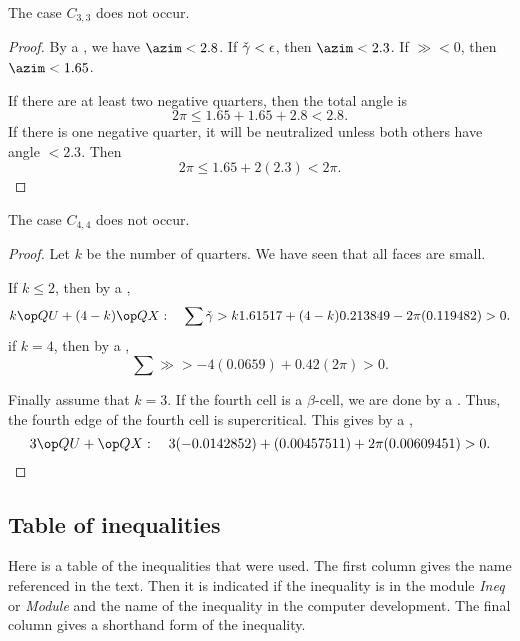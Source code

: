 \begin{lemma} The case $C_{3,3}$ does not occur.
\end{lemma}

\begin{proof} By a , we have
$\azim < 2.8$. If $\check\gamma<\epsilon$, then $\azim < 2.3$.  If $\gg <0$, then $\azim < 1.65$.

If there are at least two negative quarters, then the total angle is
\[
2\pi \le 1.65 + 1.65 + 2.8 < 2.8.
\]
If there is one negative quarter, it will be neutralized unless both others have angle $< 2.3$.  Then
\[
2\pi \le 1.65 + 2 (2.3) < 2\pi.
\]
\end{proof}

\begin{lemma}
The case $C_{4,4}$ does not occur.
\end{lemma}

\begin{proof} Let $k$ be the number of quarters.  We have seen that all faces are small.

If $k\le 2$, then by a ,
\[
k\QU + (4-k)\QX:\quad \sum\gg > k 1.61517 + (4-k) 0.213849 - 2\pi (0.119482) > 0.
\]
if $k=4$, then by a ,
\[
\sum \gg > -4 (0.0659) + 0.42 (2\pi) > 0.
\]

Finally assume that $k=3$.  If the fourth cell is a $\beta$-cell, we are done by
a .  Thus, the fourth edge of the fourth cell is supercritical.  This gives by a ,
\[
3\QU + \QX:\quad 3(-0.0142852) + (0.00457511) + 2\pi (0.00609451) > 0.
\]
\end{proof}

\subsection{Table of inequalities}

Here is a table of the inequalities that were used.  The first column gives
the name referenced in the text.  Then it is indicated if the inequality
is in the module {\it Ineq} or {\it Module} and the name of the inequality
in the computer development. The final column gives a shorthand form of the
inequality.

